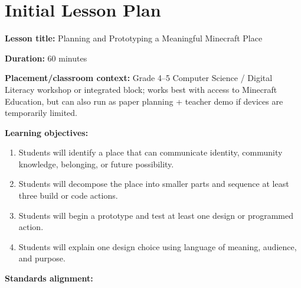 \documentclass[11pt]{article}
\begin{document}
\section*{Initial Lesson Plan}

\textbf{Lesson title:} Planning and Prototyping a Meaningful Minecraft Place

\textbf{Duration:} 60 minutes

\textbf{Placement/classroom context:} Grade 4--5 Computer Science / Digital Literacy workshop or integrated block; works best with access to Minecraft Education, but can also run as paper planning + teacher demo if devices are temporarily limited.

\textbf{Learning objectives:}
\begin{enumerate}[leftmargin=*]
    \item Students will identify a place that can communicate identity, community knowledge, belonging, or future possibility.
    \item Students will decompose the place into smaller parts and sequence at least three build or code actions.
    \item Students will begin a prototype and test at least one design or programmed action.
    \item Students will explain one design choice using language of meaning, audience, and purpose.
\end{enumerate}

\textbf{Standards alignment:}
\end{document}
